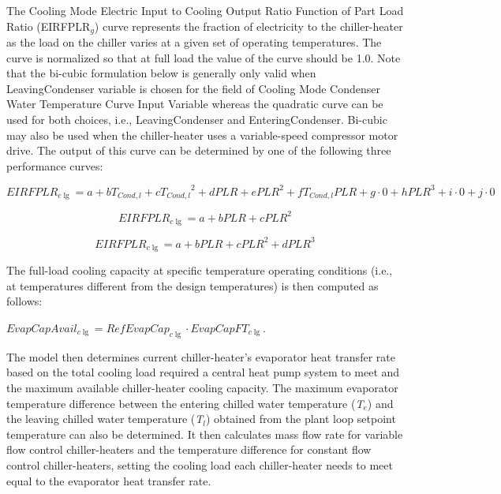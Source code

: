 The Cooling Mode Electric Input to Cooling Output Ratio Function of Part Load Ratio (EIRFPLR\(_{g}\)) curve represents the fraction of electricity to the chiller-heater as the load on the chiller varies at a given set of operating temperatures. The curve is normalized so that at full load the value of the curve should be 1.0. Note that the bi-cubic formulation below is generally only valid when LeavingCondenser variable is chosen for the field of Cooling Mode Condenser Water Temperature Curve Input Variable whereas the quadratic curve can be used for both choices, i.e., LeavingCondenser and EnteringCondenser. Bi-cubic may also be used when the chiller-heater uses a variable-speed compressor motor drive. The output of this curve can be determined by one of the following three performance curves:

\begin{equation}
EIRFPL{R_{c\lg }} = a + b{T_{Cond,l}} + c{T_{Cond,l}}^2 + dPLR + ePL{R^2} + f{T_{Cond,l}}PLR + g \cdot 0 + hPL{R^3} + i \cdot 0 + j \cdot 0
\end{equation}

\begin{equation}
EIRFPL{R_{c\lg }} = a + bPLR + cPL{R^2}
\end{equation}

\begin{equation}
EIRFPL{R_{c\lg }} = a + bPLR + cPL{R^2} + dPL{R^3}
\end{equation}

The full-load cooling capacity at specific temperature operating conditions (i.e., at temperatures different from the design temperatures) is then computed as follows:

\textbf{\emph{\(EvapCapAvai{l_{c\lg }} = RefEvapCa{p_{c\lg }} \cdot EvapCapF{T_{c\lg }}\)}}.

The model then determines current chiller-heater's evaporator heat transfer rate based on the total cooling load required a central heat pump system to meet and the maximum available chiller-heater cooling capacity. The maximum evaporator temperature difference between the entering chilled water temperature (\emph{T\(_{e}\)}) and the leaving chilled water temperature (\emph{T\(_{l}\)}) obtained from the plant loop setpoint temperature can also be determined. It then calculates mass flow rate for variable flow control chiller-heaters and the temperature difference for constant flow control chiller-heaters, setting the cooling load each chiller-heater needs to meet equal to the evaporator heat transfer rate.

